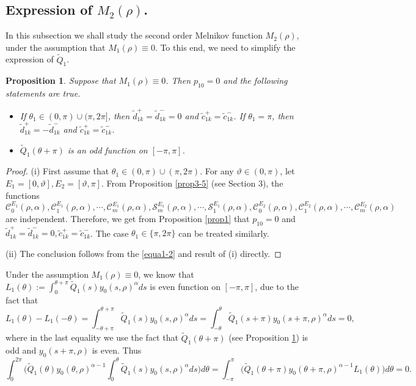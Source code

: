 \documentclass[11pt]{amsart}
\newtheorem{prop}[thm]{Proposition}
\theoremstyle{remark}
\theoremstyle{definition}
\begin{document}
\subsection{Expression of $M_{2}(\rho)$.}
In this subsection we shall     study the  second order   Melnikov function $M_2(\rho)$, under the assumption    that $M_1(\rho)\equiv 0$. To this end, we need to simplify the
expression of $\tilde{Q}_1$.




 \begin{prop} \label{prop1+1} Suppose that $M_1(\rho)\equiv 0$. Then $p_{10}=0$ and the following statements are true.
 \begin{itemize}
 \item[(i)] If $\theta_1\in (0, \pi)\cup(\pi, 2\pi]$,  then $\tilde{d}_{1k}^{+}=\tilde{d}_{1k}^{-}=0$ and $ \tilde{c}_{1k}^{+}=\tilde{c}_{1k}^{-}$.
  If   $\theta_1=\pi$,  then   $\tilde{d}_{1k}^{+}=-\tilde{d}_{1k}^{-}$ and $ \tilde{c}_{1k}^{+}=\tilde{c}_{1k}^{-}$.


\item[(ii)] $ \tilde{Q}_1(\theta+\pi)$ is an odd function on $[-\pi, \pi]$.
\end{itemize}
\end{prop}
\begin{proof} (i) First assume  that  $\theta_1\in (0, \pi)\cup(\pi, 2\pi)$.
For any  $ \vartheta\in (0, \pi)$, let  $E_1=[0, \vartheta], E_2=[\vartheta, \pi]$.  From  Proposition \ref{prop3-5} (see Section 3), the functions
\begin{equation*}\mathcal{C}_{0}^{E_1}(\rho,\alpha), \mathcal{C}_{1}^{E_1}(\rho,\alpha), \cdots, \mathcal{C}_{m}^{E_1}(\rho,\alpha), \mathcal{S}_{m}^{E_1}(\rho,\alpha), \cdots, \mathcal{S}_{1}^{E_1}(\rho,\alpha),
 \mathcal{C}_{0}^{E_2}(\rho,\alpha), \mathcal{C}_{1}^{E_2}(\rho,\alpha), \cdots, \mathcal{C}_{m}^{E_2}(\rho,\alpha)\end{equation*} are independent.  Therefore, we get from Proposition \ref{prop1}   that
 $p_{10}=0$ and $\tilde{d}_{1k}^{+}=\tilde{d}_{1k}^{-}=0, \tilde{c}_{1k}^{+}=\tilde{c}_{1k}^{-}$.  The case $\theta_1\in \{\pi, 2\pi\}$ can be treated similarly.

 (ii) The conclusion follows from the \eqref{equa1-2} and result of (i) directly.
\end{proof}



Under the assumption  $M_1(\rho)\equiv 0$, we know that
 $L_1(\theta):= \int_{0}^{\theta+\pi} \tilde{Q}_1(s)y_0(s,\rho)^{\alpha}d s$ is even function on $[-\pi, \pi]$, due to the fact that
$$L_1(\theta)-L_1(-\theta)= \int_{-\theta+\pi}^{\theta+\pi} \tilde{Q}_1(s)y_0(s,\rho)^{\alpha}d s= \int_{-\theta}^{\theta} \tilde{Q}_1(s+\pi)y_0(s+\pi,\rho)^{\alpha}d s=0,$$
where in the last equality we use the fact that $ \tilde{Q}_1(\theta+\pi)$ (see Proposition \ref{prop1+1}) is   odd and $y_0(s+\pi,\rho)$ is even.
Thus \begin{equation}\label{equa4-2a1}
\int_{0}^{2\pi} \bigg(\tilde{Q}_1(\theta)y_0(\theta,\rho)^{\alpha-1} \int_{0}^{\theta} \tilde{Q}_1(s)y_0(s,\rho)^{\alpha}d s\bigg)d \theta=\int_{-\pi}^{\pi} \bigg(\tilde{Q}_1(\theta+\pi)y_0(\theta+\pi,\rho)^{\alpha-1} L_1(\theta)\bigg)d \theta=0.
\end{equation}
\end{document}

